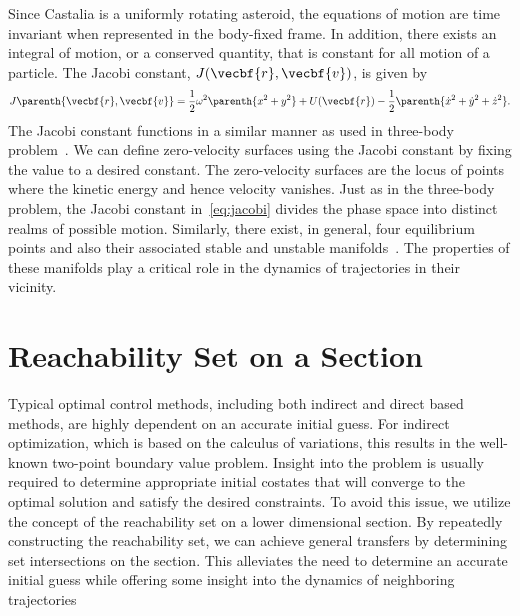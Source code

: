 Since Castalia is a uniformly rotating asteroid, the equations of motion are time invariant when represented in the body-fixed frame.
In addition, there exists an integral of motion, or a conserved quantity, that is constant for all motion of a particle.
The Jacobi constant, \( J (\vecbf{r} , \vecbf{v} ) \), is given by
\begin{align}\label{eq:jacobi}
    J \parenth{\vecbf{r}, \vecbf{v}} = \frac{1}{2} \omega^2 \parenth{x^2 + y^2} + U(\vecbf{r}) - \frac{1}{2} \parenth{\dot{x}^2 + \dot{y}^2 + \dot{z}^2} .
\end{align}
The Jacobi constant functions in a similar manner as used in three-body problem~\cite{szebehely1967}.
We can define zero-velocity surfaces using the Jacobi constant by fixing the value to a desired constant.
The zero-velocity surfaces are the locus of points where the kinetic energy and hence velocity vanishes.
Just as in the three-body problem, the Jacobi constant in~\cref{eq:jacobi} divides the phase space into distinct realms of possible motion.
Similarly, there exist, in general, four equilibrium points and also their associated stable and unstable manifolds~\cite{scheeres1996,scheeres1994}.
The properties of these manifolds play a critical role in the dynamics of trajectories in their vicinity.

\section{Reachability Set on a \Poincare Section}\label{sec:reachability}

Typical optimal control methods, including both indirect and direct based methods, are highly dependent on an accurate initial guess.
For indirect optimization, which is based on the calculus of variations, this results in the well-known two-point boundary value problem.
Insight into the problem is usually required to determine appropriate initial costates that will converge to the optimal solution and satisfy the desired constraints.
To avoid this issue, we utilize the concept of the reachability set on a lower dimensional \Poincare section.
By repeatedly constructing the reachability set, we can achieve general transfers by determining set intersections on the \Poincare section.
This alleviates the need to determine an accurate initial guess while offering some insight into the dynamics of neighboring trajectories

